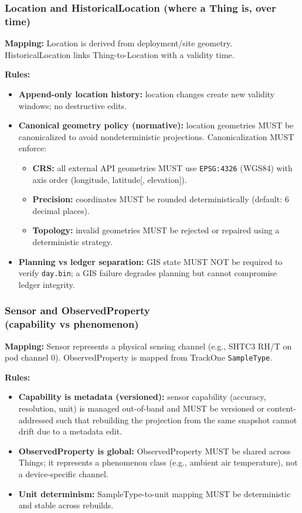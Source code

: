 \subsubsection{Location and HistoricalLocation (where a Thing is, over time)}
\textbf{Mapping:} Location is derived from deployment/site geometry.
HistoricalLocation links Thing-to-Location with a
validity time.

\textbf{Rules:}
\begin{itemize}[nosep]
  \item \textbf{Append-only location history:} location changes create new validity windows; no destructive edits.
  \item \textbf{Canonical geometry policy (normative):} location geometries MUST be canonicalized to avoid nondeterministic projections.
  Canonicalization MUST enforce:
    \begin{itemize}[nosep]
      \item \textbf{CRS:} all external \ac{API} geometries MUST use \texttt{EPSG:4326} (WGS84) with axis order (longitude, latitude[, elevation]).
      \item \textbf{Precision:} coordinates MUST be rounded deterministically (default: 6 decimal places).
      \item \textbf{Topology:} invalid geometries MUST be rejected or repaired using a deterministic strategy.
    \end{itemize}
  \item \textbf{Planning vs ledger separation:} \ac{GIS} state MUST NOT be required to verify \texttt{day.bin}; a \ac{GIS}
  failure degrades planning but cannot compromise ledger integrity.
\end{itemize}

\subsubsection[Sensor and ObservedProperty   (capability vs phenomenon)]{Sensor and ObservedProperty\\ (capability vs phenomenon)}
\textbf{Mapping:} Sensor represents a physical sensing channel (e.g., SHTC3 RH/T on pod channel 0).
ObservedProperty is
mapped from TrackOne \texttt{SampleType}.

\textbf{Rules:}
\begin{itemize}[nosep]
  \item \textbf{Capability is metadata (versioned):} sensor capability (accuracy, resolution, unit) is managed out-of-band
    and MUST be versioned or content-addressed such that rebuilding the projection from the same snapshot cannot drift
    due to a metadata edit.
  \item \textbf{ObservedProperty is global:} ObservedProperty MUST be shared across Things; it represents a phenomenon
    class (e.g., ambient air temperature), not a device-specific channel.
  \item \textbf{Unit determinism:} SampleType-to-unit mapping MUST be deterministic and stable across rebuilds.
\end{itemize}

